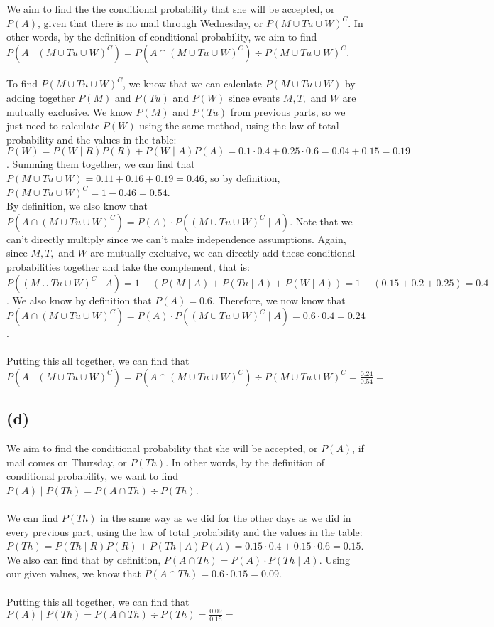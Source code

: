 \documentclass{article}
\begin{document}
{We aim to find the the conditional probability that she will be accepted, or $P(A)$, given that there is no mail through Wednesday, or $P(M \cup Tu \cup W)^C$. In other words, by the definition of conditional probability, we aim to find $P(A \mid (M \cup Tu \cup W)^C) = P(A \cap (M \cup Tu \cup W)^C) \div P(M \cup Tu \cup W)^C$. \\ \\ 
To find $P(M \cup Tu \cup W)^C$, we know that we can calculate $P(M \cup Tu \cup W)$ by adding together $P(M)$ and $P(Tu)$ and $P(W)$ since events $M, T, $ and $W$ are mutually exclusive. We know $P(M)$ and $P(Tu)$ from previous parts, so we just need to calculate $P(W)$ using the same method, using the law of total probability and the values in the table: $P(W) = P(W \mid R)P(R) + P(W \mid A)P(A) = 0.1 \cdot 0.4 + 0.25 \cdot 0.6 = 0.04 + 0.15 = 0.19$. Summing them together, we can find that $P(M \cup Tu \cup W) = 0.11 + 0.16 + 0.19 = 0.46$, so by definition, $P(M \cup Tu \cup W)^C = 1 - 0.46 = 0.54$. \\
By definition, we also know that $P(A \cap (M \cup Tu \cup W)^C) = P(A) \cdot P((M \cup Tu \cup W)^C \mid A)$. Note that we can't directly multiply since we can't make independence assumptions. Again, since $M, T, $ and $W$ are mutually exclusive, we can directly add these conditional probabilities together and take the complement, that is: \\
$P((M \cup Tu \cup W)^C \mid A) = 1 - (P(M \mid A) + P(Tu \mid A) + P(W \mid A)) = 1 - (0.15 + 0.2 + 0.25) = 0.4$. We also know by definition that $P(A) = 0.6$. Therefore, we now know that $P(A \cap (M \cup Tu \cup W)^C) = P(A) \cdot P((M \cup Tu \cup W)^C \mid A) = 0.6 \cdot 0.4 = 0.24$. \\ \\ 
Putting this all together, we can find that $P(A \mid (M \cup Tu \cup W)^C) = P(A \cap (M \cup Tu \cup W)^C) \div P(M \cup Tu \cup W)^C = \frac{0.24}{0.54} = $ 

\subsection*{(d)}

We aim to find the conditional probability that she will be accepted, or $P(A)$, if mail comes on Thursday, or $P(Th)$. In other words, by the definition of conditional probability, we want to find $P(A) \mid P(Th) = P(A \cap Th) \div P(Th)$. \\ \\ 
We can find $P(Th)$ in the same way as we did for the other days as we did in every previous part, using the law of total probability and the values in the table: $P(Th) = P(Th \mid R)P(R) + P(Th \mid A)P(A) = 0.15 \cdot 0.4 + 0.15 \cdot 0.6 = 0.15$. We also can find that by definition, $P(A \cap Th) = P(A) \cdot P(Th \mid A)$. Using our given values, we know that $P(A \cap Th) = 0.6 \cdot 0.15 = 0.09$.
\\ \\ 
Putting this all together, we can find that $P(A) \mid P(Th) = P(A \cap Th) \div P(Th) = \frac{0.09}{0.15} = $ 

}
\end{document}

